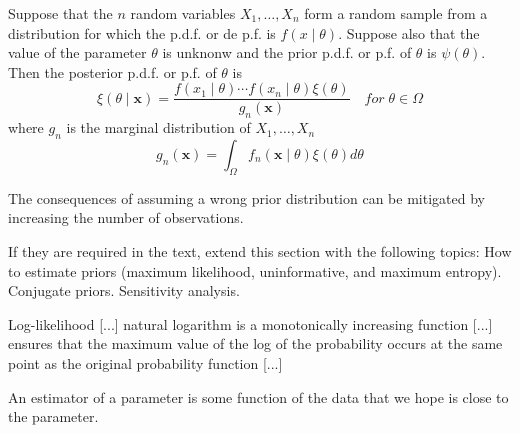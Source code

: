 {\color{red} 

\begin{proposition}
Suppose that the $n$ random variables $X_1, \ldots, X_n$ form a random sample from a distribution for which the p.d.f. or de p.f. is $f \left( x \mid \theta \right)$. Suppose also that the value of the parameter $\theta$ is unknonw and the prior p.d.f. or p.f. of $\theta$ is $\psi \left( \theta \right)$. Then the posterior p.d.f. or p.f. of $\theta$ is
\[
\xi\left(\theta\mid\mathbf{x}\right)=\frac{f\left(x_{1}\mid\theta\right)\cdots f\left(x_{n}\mid\theta\right)\xi\left(\theta\right)}{g_{n}\left(\mathbf{x}\right)}\quad for\;\theta\in\Omega
\]
where $g_{n}$ is the marginal distribution of $X_{1},\ldots,X_{n}$
\[
g_{n}\left(\mathbf{x}\right)=\int_{\Omega}f_{n}\left(\mathbf{x}\mid\theta\right)\xi\left(\theta\right)d\theta
\]
\end{proposition}

}

The consequences of assuming a wrong prior distribution can be mitigated by increasing the number of observations.

\begin{example}
\end{example}

{\color{red} If they are required in the text, extend this section with the following topics: How to estimate priors (maximum likelihood, uninformative, and maximum entropy). Conjugate priors. Sensitivity analysis.}

{\color{red} Log-likelihood [...] natural logarithm is a monotonically increasing function [...] ensures that the maximum value of the log of the probability occurs at the same point as the original probability function [...]}

{\color{red} An estimator of a parameter is some function of the data that we hope is close to the parameter.}

